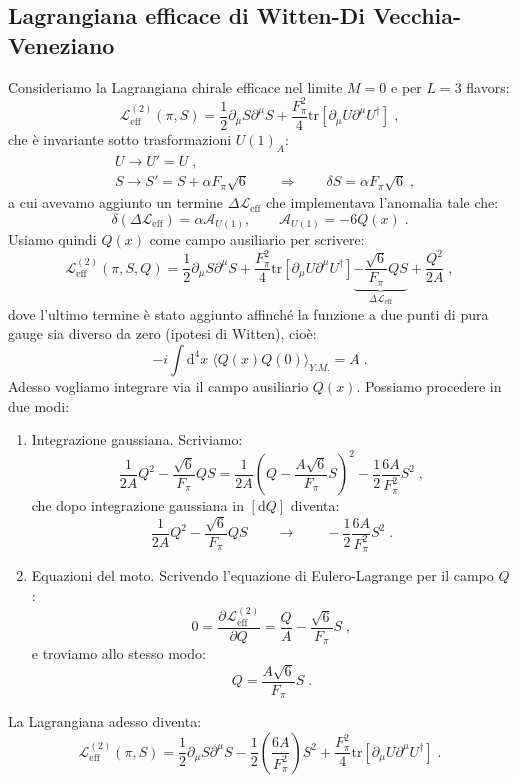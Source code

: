 \documentclass[12pt,a4paper]{article}
\theoremstyle{definition}
\newcommand{\pdev}[3][]{\frac{\partial^{#1} #2}{\partial #3^{#1}}}
\newcommand{\lag}{\mathcal{L}}
\newcommand{\diff}[1][]{\mathrm{d}#1}
\newcommand{\bra}{\langle}
\newcommand{\ket}{\rangle}
\newcommand{\adj}[1]{#1^{\dagger}}
\newcommand{\tr}{\mathrm{tr}}
\numberwithin{equation}{section}
\begin{document}
\subsection{Lagrangiana efficace di Witten-Di Vecchia-Veneziano}
Consideriamo la Lagrangiana chirale efficace nel limite $M=0$ e per $L=3$ flavors:
$$
\lag_{\mathrm{eff}}^{(2)}(\pi,S)=\frac{1}{2}\partial_{\mu}S\partial^{\mu}S+\frac{F_{\pi}^2}{4}\tr[\partial_{\mu}U\partial^{\mu}\adj{U}]\;,
$$
che è invariante sotto trasformazioni $U(1)_A$:
\begin{align*}
&U\to U'=U\;, \\
&S\to S'=S+\alpha F_{\pi}\sqrt{6}\qquad \Longrightarrow\qquad \delta S=\alpha F_{\pi}\sqrt{6}\;,
\end{align*}
a cui avevamo aggiunto un termine $\Delta\lag_{\mathrm{eff}}$ che implementava l'anomalia tale che:
$$
\delta(\Delta\lag_{\mathrm{eff}})=\alpha\mathcal{A}_{U(1)},\qquad \mathcal{A}_{U(1)}=-6Q(x)\;.
$$
Usiamo quindi $Q(x)$ come campo ausiliario per scrivere:
\begin{equation}
\lag_{\mathrm{eff}}^{(2)}(\pi,S,Q)=\frac{1}{2}\partial_{\mu}S\partial^{\mu}S+\frac{F_{\pi}^2}{4}\tr[\partial_{\mu}U\partial^{\mu}\adj{U}]\underbrace{-\frac{\sqrt{6}}{F_{\pi}}QS}_{\Delta\lag_{\mathrm{eff}}}+\frac{Q^2}{2A}\;,
\end{equation}
dove l'ultimo termine è stato aggiunto affinché la funzione a due punti di pura gauge sia diverso da zero (ipotesi di Witten), cioè:
$$
-i\int\diff^4{x}\;\bra Q(x)Q(0)\ket_{Y.M.}=A\;.
$$
Adesso vogliamo integrare via il campo ausiliario $Q(x)$. Possiamo procedere in due modi:
\begin{enumerate}
\item Integrazione gaussiana. Scriviamo:
$$
\frac{1}{2A}Q^2-\frac{\sqrt{6}}{F_{\pi}}QS=\frac{1}{2A}\left(Q-\frac{A\sqrt{6}}{F_{\pi}}S\right)^2-\frac{1}{2}\frac{6A}{F_{\pi}^2}S^2\;,
$$
che dopo integrazione gaussiana in $[\diff{Q}]$ diventa:
$$
\frac{1}{2A}Q^2-\frac{\sqrt{6}}{F_{\pi}}QS\qquad \longrightarrow\qquad -\frac{1}{2}\frac{6A}{F_{\pi}^2}S^2\;.
$$
\item Equazioni del moto. Scrivendo l'equazione di Eulero-Lagrange per il campo $Q$:
$$
0=\pdev{\lag_{\mathrm{eff}}^{(2)}}{Q}=\frac{Q}{A}-\frac{\sqrt{6}}{F_{\pi}}S\;,
$$
e troviamo allo stesso modo:
$$
Q=\frac{A\sqrt{6}}{F_{\pi}}S\;.
$$
\end{enumerate}
La Lagrangiana adesso diventa:
\begin{equation}
\lag_{\mathrm{eff}}^{(2)}(\pi,S)=\frac{1}{2}\partial_{\mu}S\partial^{\mu}S-\frac{1}{2}\left(\frac{6A}{F_{\pi}^2}\right)S^2+\frac{F_{\pi}^2}{4}\tr[\partial_{\mu}U\partial^{\mu}\adj{U}]\;.
\end{equation}
\end{document}
